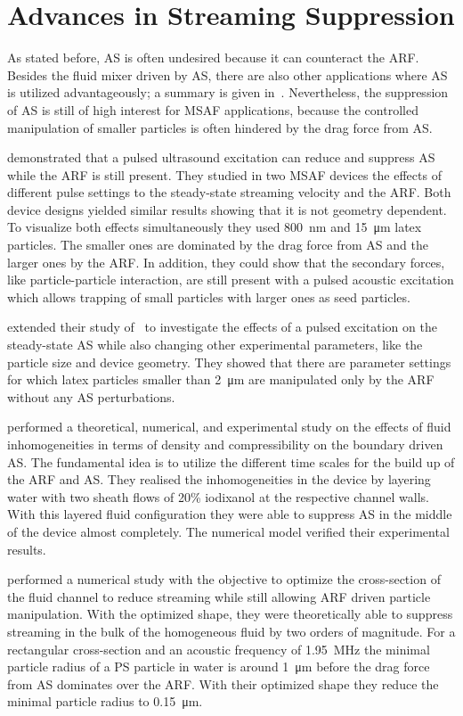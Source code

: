 \section{Advances in Streaming Suppression}

As stated before, AS is often undesired because it can counteract the ARF. 
Besides the fluid mixer driven by AS, there are also other applications where 
AS is utilized advantageously; a summary is given in~\cite{Wiklund2012a}. 
Nevertheless, the suppression of AS is still of high interest for MSAF 
applications, because the controlled manipulation of smaller particles is often 
hindered by the drag force from AS.

 demonstrated that a pulsed ultrasound excitation can reduce 
and suppress AS while the ARF is still present. They studied in two MSAF 
devices the effects of different pulse settings to the steady-state streaming 
velocity and the ARF. Both device designs yielded similar results showing that 
it is not geometry dependent. To visualize both effects simultaneously they 
used \SI{800}{\nm} and \SI{15}{\um} latex particles. The smaller ones are 
dominated by the drag force from AS and the larger ones by the ARF. In 
addition, they could show that the secondary forces, like particle-particle 
interaction, are still present with a pulsed acoustic excitation which allows 
trapping of small particles with larger ones as seed particles.

 extended their study of~ to investigate the 
effects of a pulsed excitation on the steady-state AS while also changing other 
experimental parameters, like the particle size and device geometry. They 
showed that there are parameter settings for which latex particles smaller than 
\SI{2}{\um} are manipulated only by the ARF without any AS perturbations.

 performed a theoretical, numerical, and experimental study 
on the effects of fluid inhomogeneities in terms of density and compressibility 
on the boundary driven AS. The fundamental idea is to utilize the different 
time scales for the build up of the ARF and AS. They realised the 
inhomogeneities in the device by layering water with two sheath flows of 20\% 
iodixanol at the respective channel walls. With this layered fluid 
configuration they were able to suppress AS in the middle of the device almost 
completely. The numerical model verified their experimental results.

 performed a numerical study with the objective to optimize the 
cross-section of the fluid channel to reduce streaming while still allowing ARF 
driven particle manipulation. With the optimized shape, they were theoretically 
able to suppress streaming in the bulk of the homogeneous fluid by two orders 
of magnitude. For a rectangular cross-section and an acoustic frequency of 
\SI{1.95}{\mega\hertz} the minimal particle radius of a PS particle in water is 
around \SI{1}{\um} before the drag force from AS dominates over the ARF. With 
their optimized shape they reduce the minimal particle radius to 
\SI{0.15}{\um}.

